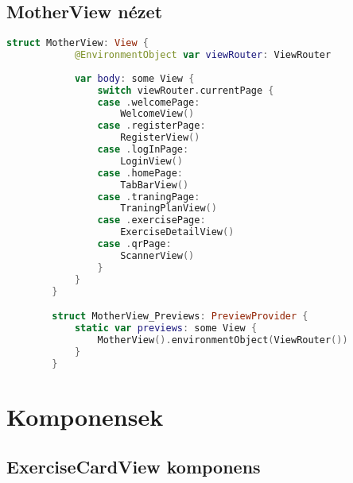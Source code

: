 \subsection*{MotherView nézet}

\begin{spacing}{2}
\end{spacing}
\begin{minipage}{\textwidth}
    \linespread{0.8}\selectfont
    \begin{lstlisting}[language=swift]
        struct MotherView: View {
            @EnvironmentObject var viewRouter: ViewRouter
            
            var body: some View {
                switch viewRouter.currentPage {
                case .welcomePage:
                    WelcomeView()
                case .registerPage:
                    RegisterView()
                case .logInPage:
                    LoginView()
                case .homePage:
                    TabBarView()
                case .traningPage:
                    TraningPlanView()
                case .exercisePage:
                    ExerciseDetailView()
                case .qrPage:
                    ScannerView()
                }
            }
        }

        struct MotherView_Previews: PreviewProvider {
            static var previews: some View {
                MotherView().environmentObject(ViewRouter())
            }
        }
    \end{lstlisting}   
\end{minipage}

\section*{Komponensek} 

\subsection*{ExerciseCardView komponens}

